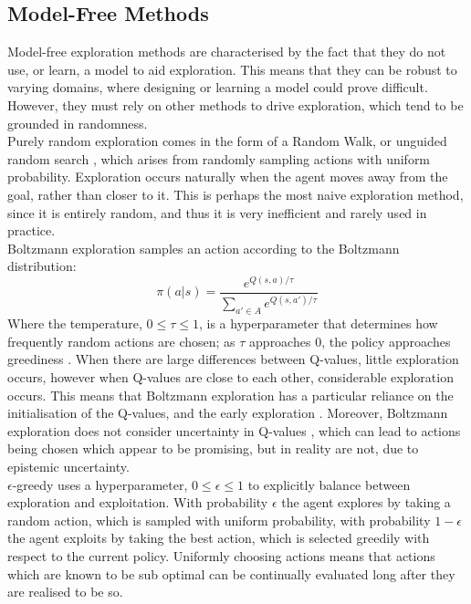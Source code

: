 \subsection{Model-Free Methods}
Model-free exploration methods are characterised by the fact that they do not use, or learn, a model to aid exploration. This means that they can be robust to varying domains, where designing or learning a model could prove difficult. However, they must rely on other methods to drive exploration, which tend to be grounded in randomness.
\\Purely random exploration comes in the form of a Random Walk, or unguided random search \cite{anderson86}, which arises from randomly sampling actions with uniform probability. Exploration occurs naturally when the agent moves away from the goal, rather than closer to it. This is perhaps the most naive exploration method, since it is entirely random, and thus it is very inefficient and rarely used in practice.
\\ Boltzmann exploration samples an action according to the Boltzmann distribution:
\begin{equation}
\label{eqn:boltzmann}
\pi(a|s) = \frac{e^{Q(s,a)/\tau}}{\sum_{a' \in A}e^{Q(s,a')/\tau}}
\end{equation}
Where the temperature, $0 \le \tau \le 1$, is a hyperparameter that determines how frequently random actions are chosen; as $\tau$ approaches 0, the policy approaches greediness \cite{Thrun-1992-15850, DBLP:journals/corr/abs-2109-00157}. When there are large differences between Q-values, little exploration occurs, however when Q-values are close to each other, considerable exploration occurs. This means that Boltzmann exploration has a particular reliance on the initialisation of the Q-values, and the early exploration \cite{wiering}. Moreover, Boltzmann exploration does not consider uncertainty in Q-values \cite{DBLP:journals/corr/Cesa-BianchiGLN17}, which can lead to actions being chosen which appear to be promising, but in reality are not, due to epistemic uncertainty. 
\\$\epsilon$-greedy \cite{Watkins:1989, conf/nips/Sutton95} uses a hyperparameter, $0 \le \epsilon \le 1$ to explicitly balance between exploration and exploitation. With probability $\epsilon$ the agent explores by taking a random action, which is sampled with uniform probability, with probability $1-\epsilon$ the agent exploits by taking the best action, which is selected greedily with respect to the current policy. Uniformly choosing actions means that actions which are known to be sub optimal can be continually evaluated long after they are realised to be so.
